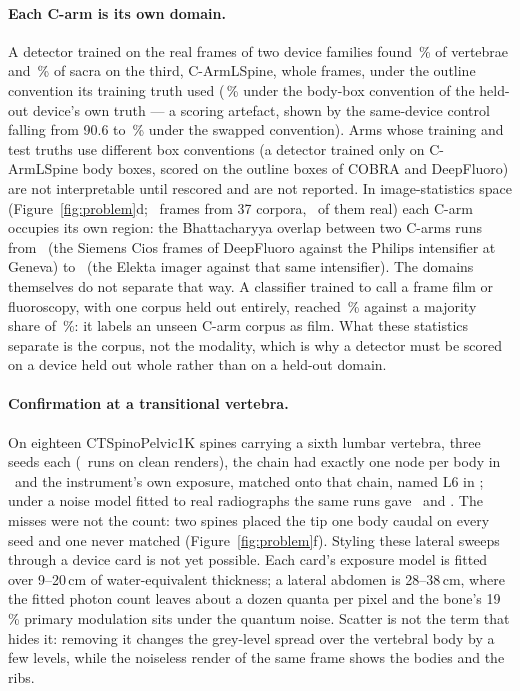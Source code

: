 \documentclass[11pt,letterpaper]{article}
\begin{document}
\paragraph{Each C-arm is its own domain.} A detector trained on the real frames of two device families found \clLodoCarmHeldoutVertOutlineZeroTwoFive\,\% of vertebrae and \clLodoCarmHeldoutSacrumZeroTwoFive\,\% of sacra on the third, C-ArmLSpine, whole frames, under the outline convention its training truth used (\clLodoCarmHeldoutVertBodyZeroTwoFive\,\% under the body-box convention of the held-out device's own truth --- a scoring artefact, shown by the same-device control falling from 90.6 to \clPooledCarmVertOutlineZeroTwoFiveControl\,\% under the swapped convention). Arms whose training and test truths use different box conventions (a detector trained only on C-ArmLSpine body boxes, scored on the outline boxes of COBRA and DeepFluoro) are not interpretable until rescored and are not reported. In image-statistics space (Figure~\ref{fig:problem}d; \clManifoldAllN\ frames from 37 corpora, \clManifoldAllNReal\ of them real) each C-arm occupies its own region: the Bhattacharyya overlap between two C-arms runs from \clManifoldCarmPairMin\ (the Siemens Cios frames of DeepFluoro against the Philips intensifier at Geneva) to \clManifoldCarmPairMax\ (the Elekta imager against that same intensifier). The domains themselves do not separate that way. A classifier trained to call a frame film or fluoroscopy, with one corpus held out entirely, reached \clManifoldLofoPooled\,\% against a majority share of \clManifoldLofoChance\,\%: it labels an unseen C-arm corpus as film. What these statistics separate is the corpus, not the modality, which is why a detector must be scored on a device held out whole rather than on a held-out domain.
\paragraph{Confirmation at a transitional vertebra.} On eighteen CTSpinoPelvic1K spines carrying a sixth lumbar vertebra, three seeds each (\clLstvRuns\ runs on clean renders), the chain had exactly one node per body in \clLstvCleanExactChain\ and the instrument's own exposure, matched onto that chain, named L6 in \clLstvCleanLSix; under a noise model fitted to real radiographs the same runs gave \clLstvFilmExactChain\ and \clLstvFilmLSix. The misses were not the count: two spines placed the tip one body caudal on every seed and one never matched (Figure~\ref{fig:problem}f). Styling these lateral sweeps through a device card is not yet possible. Each card's exposure model is fitted over 9--20\,cm of water-equivalent thickness; a lateral abdomen is 28--38\,cm, where the fitted photon count leaves about a dozen quanta per pixel and the bone's 19\,\% primary modulation sits under the quantum noise. Scatter is not the term that hides it: removing it changes the grey-level spread over the vertebral body by a few levels, while the noiseless render of the same frame shows the bodies and the ribs.
\end{document}
